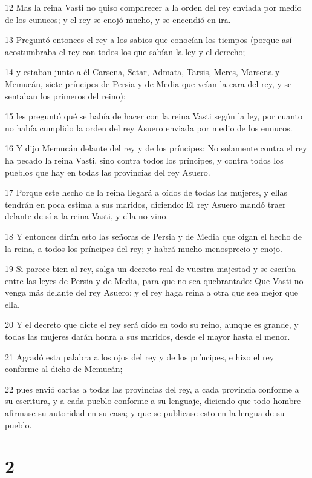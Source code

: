 \par 12 Mas la reina Vasti no quiso comparecer a la orden del rey enviada por medio de los eunucos; y el rey se enojó mucho, y se encendió en ira.
\par 13 Preguntó entonces el rey a los sabios que conocían los tiempos (porque así acostumbraba el rey con todos los que sabían la ley y el derecho; 
\par 14 y estaban junto a él Carsena, Setar, Admata, Tarsis, Meres, Marsena y Memucán, siete príncipes de Persia y de Media que veían la cara del rey, y se sentaban los primeros del reino);
\par 15 les preguntó qué se había de hacer con la reina Vasti según la ley, por cuanto no había cumplido la orden del rey Asuero enviada por medio de los eunucos.
\par 16 Y dijo Memucán delante del rey y de los príncipes: No solamente contra el rey ha pecado la reina Vasti, sino contra todos los príncipes, y contra todos los pueblos que hay en todas las provincias del rey Asuero.
\par 17 Porque este hecho de la reina llegará a oídos de todas las mujeres, y ellas tendrán en poca estima a sus maridos, diciendo: El rey Asuero mandó traer delante de sí a la reina Vasti, y ella no vino.
\par 18 Y entonces dirán esto las señoras de Persia y de Media que oigan el hecho de la reina, a todos los príncipes del rey; y habrá mucho menosprecio y enojo.
\par 19 Si parece bien al rey, salga un decreto real de vuestra majestad y se escriba entre las leyes de Persia y de Media, para que no sea quebrantado: Que Vasti no venga más delante del rey Asuero; y el rey haga reina a otra que sea mejor que ella.
\par 20 Y el decreto que dicte el rey será oído en todo su reino, aunque es grande, y todas las mujeres darán honra a sus maridos, desde el mayor hasta el menor.
\par 21 Agradó esta palabra a los ojos del rey y de los príncipes, e hizo el rey conforme al dicho de Memucán;
\par 22 pues envió cartas a todas las provincias del rey, a cada provincia conforme a su escritura, y a cada pueblo conforme a su lenguaje, diciendo que todo hombre afirmase su autoridad en su casa; y que se publicase esto en la lengua de su pueblo.

\chapter{2}

